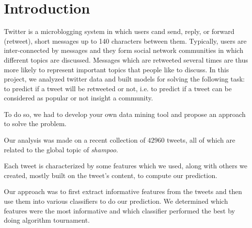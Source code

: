 \section{Introduction}

Twitter is a microblogging system in which users cand send, reply, or forward
(retweet), short messages up to 140 characters between them. Typically, users
are inter-connected by messages and they form social network communities in
which different topics are discussed. Messages which are retweeted several times
are thus more likely to represent important topics that people like to discuss.
In this project, we analyzed twitter data and built models for solving 
the following task: to predict if a tweet will be retweeted or not, i.e. to 
predict if a tweet can be considered as popular or not insight a community.

To do so, we had to develop your own data mining tool and propose an
approach to solve the problem.

Our analysis was made on a recent collection of $42960$ tweets, all of which 
are related to the global topic of \textit{shampoo}.

Each tweet is characterized by some features which we used, along with others 
we created, mostly built on the tweet's content, to compute our prediction.

Our approach was to first extract informative features from the tweets and then 
use them into various classifiers to do our prediction. We determined which 
features were the most informative and which classifier performed the best by 
doing algorithm tournament.
